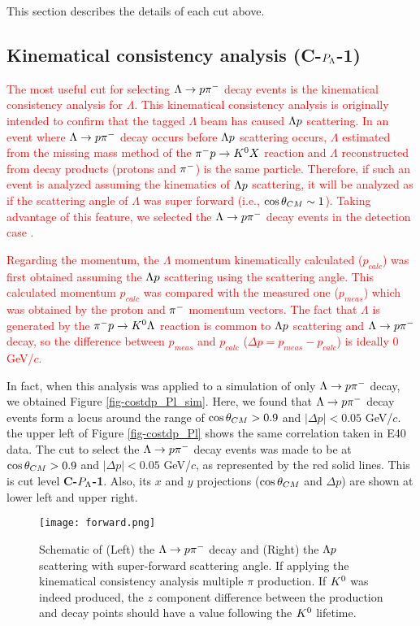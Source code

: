 This section describes the details of each cut above.

\subsection{Kinematical consistency analysis ({\bf C-$P_{\Lambda}$-1})}
\label{sec-Pl-kinema}

\textcolor{red}{ The most useful cut for selecting $\Lambda\to p\pi^{-}$ decay events is the kinematical consistency analysis for $\Lambda$. This kinematical consistency analysis is originally intended to confirm that the tagged $\Lambda$ beam has caused $\Lambda p$ scattering. In an event where $\Lambda\to p\pi^{-}$ decay occurs before $\Lambda p$ scattering occurs, $\Lambda$ estimated from the missing mass method of the $\pi^- p \to K^0 X$ reaction and $\Lambda$ reconstructed from decay products (protons and $\pi^{-}$) is the same particle. Therefore, if such an event is analyzed assuming the kinematics of $\Lambda p$ scattering, it will be analyzed as if the scattering angle of $\Lambda$ was super forward (i.e., $\cos{\theta}_{CM} \sim 1$). Taking advantage of this feature, we selected the $\Lambda\to p\pi^{-}$ decay events in the detection case . }

\textcolor{red}{ Regarding the momentum, the $\Lambda$ momentum kinematically calculated ($p_{calc}$) was first obtained assuming the $\Lambda p$ scattering using the scattering angle. This calculated momentum $p_{calc}$ was compared with the measured one ($p_{meas}$) which was obtained by the proton and $\pi^{-}$ momentum vectors. The fact that $\Lambda$ is generated by the $\pi^- p \to K^0 \Lambda$ reaction is common to $\Lambda p$ scattering and $\Lambda\to p\pi^{-}$ decay, so the difference between $p_{meas}$ and $p_{calc}$ ($\Delta p = p_{meas} - p_{calc}$) is ideally 0 GeV/$c$. }

In fact, when this analysis was applied to a simulation of only $\Lambda\to p\pi^{-}$ decay, we obtained Figure \ref{fig-costdp_Pl_sim}. Here, we found that $\Lambda\to p\pi^{-}$ decay events form a locus around the range of $\cos{\theta}_{CM}>0.9$ and $|\Delta p| < 0.05$ GeV/$c$. the upper left of Figure \ref{fig-costdp_Pl} shows the same correlation taken in E40 data. The cut to select the $\Lambda\to p\pi^{-}$ decay events was made to be at $\cos{\theta}_{CM}>0.9$ and $|\Delta p| < 0.05$ GeV/$c$, as represented by the red solid lines. This is cut level {\bf C-$P_{\Lambda}$-1}. Also, its $x$ and $y$ projections ($\cos{\theta}_{CM}$ and $\Delta p$) are shown at lower left and upper right.

\begin{figure}[h]
  \centering
  \texttt{[image: forward.png]}
  \caption{Schematic of (Left) the $\Lambda\to p\pi^{-}$ decay and (Right) the $\Lambda p$ scattering with super-forward scattering angle. If applying the kinematical consistency analysis 
  multiple $\pi$ production. If $K^{0}$ was indeed produced, the $z$ component difference between the production and decay points should have a value following the $K^{0}$ lifetime.}
  \label{fig-forward}
\end{figure}

